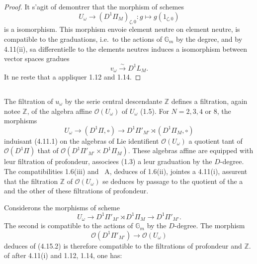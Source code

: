 \documentclass[11pt,a4paper]{article}
\theoremstyle{plain}
\theoremstyle{definition}
\newcommand{\Gm}{\mathbb{G}_m}
\newcommand{\Z}{\mathbb{Z}}
\begin{document}
\begin{proof}
It s'agit of demontrer that the morphism of schemes
\begin{equation}\label{eq:4.14.1}
U_\omega \to (D^1\Pi_M)_{\zeta,0}: g \mapsto g(1_{\zeta,0})
\end{equation}
is a isomorphism. This morphism envoie element neutre on element neutre, is compatible to the graduations, i.e.~to the actions of $\Gm$ by the degree, and by 4.11(ii), sa differentielle to the elements neutres induces a isomorphism between vector spaces gradues
\begin{equation}\label{eq:4.14.2}
v_\omega \xrightarrow{\sim} D^1L_M.
\end{equation}
It ne reste that a appliquer 1.12 and 1.14.
\end{proof}

\subsection{}
The filtration of $u_\omega$ by the serie central descendante $\Z$ defines a filtration, again notee $\Z$, of the algebra affine $\mathcal{O}(U_\omega)$ of $U_\omega$ (1.5). For $N=2,3,4$ or $8$, the morphisms
\begin{equation}\label{eq:4.15.1}
U_\omega \to (D^1\Pi, \circ) \to D^1\Pi'_{M'} \rtimes (D^1\Pi_M, \circ)
\end{equation}
induisant (4.11.1) on the algebras of Lie identifient $\mathcal{O}(U_\omega)$ a quotient tant of $\mathcal{O}(D^1\Pi)$ that of $\mathcal{O}(D^1\Pi'_{M'} \times D^1\Pi_M)$. These algebras affine are equipped with leur filtration of profondeur, associees (1.3) a leur graduation by the $D$-degree. The compatibilities 1.6(iii) and \cite{1}~A, deduces of 1.6(ii), jointes a 4.11(i), assurent that the filtration $\Z$ of $\mathcal{O}(U_\omega)$ se deduces by passage to the quotient of the a and the other of these filtrations of profondeur.

Considerons the morphisms of scheme
\begin{equation}\label{eq:4.15.2}
U_\omega \to D^1\Pi'_{M'} \rtimes D^1\Pi_M \to D^1\Pi'_{M'}.
\end{equation}
The second is compatible to the actions of $\Gm$ by the $D$-degree. The morphism
\begin{equation}\label{eq:4.15.3}
\mathcal{O}(D^1\Pi'_{M'}) \to \mathcal{O}(U_\omega)
\end{equation}
deduces of (4.15.2) is therefore compatible to the filtrations of profondeur and $\Z$. of after 4.11(i) and 1.12, 1.14, one has:
\end{document}
